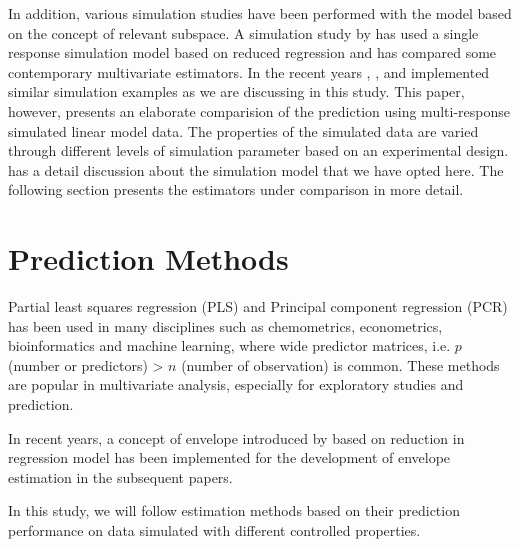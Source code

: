 \documentclass[12pt,3p,authoryear]{elsarticle}
\begin{document}
In addition, various simulation studies have been performed with the
model based on the concept of relevant subspace. A simulation study by
\citet{Alm_y_1996} has used a single response simulation model based on
reduced regression and has compared some contemporary multivariate
estimators. In the recent years \citet{helland2012near},
\citet{saebo2015simrel}, \citet{helland2016algorithms} and
\citet{Rimal2018} implemented similar simulation examples as we are
discussing in this study. This paper, however, presents an elaborate
comparision of the prediction using multi-response simulated linear
model data. The properties of the simulated data are varied through
different levels of simulation parameter based on an experimental
design. \citet{Rimal2018} has a detail discussion about the simulation
model that we have opted here. The following section presents the
estimators under comparison in more detail.

\section{Prediction Methods}\label{prediction-methods}

Partial least squares regression (PLS) and Principal component
regression (PCR) has been used in many disciplines such as chemometrics,
econometrics, bioinformatics and machine learning, where wide predictor
matrices, i.e. \(p\) (number or predictors) \textgreater{} \(n\) (number
of observation) is common. These methods are popular in multivariate
analysis, especially for exploratory studies and prediction.

In recent years, a concept of envelope introduced by \citet{Cook2007a}
based on reduction in regression model has been implemented for the
development of envelope estimation in the subsequent papers.

In this study, we will follow estimation methods based on their
prediction performance on data simulated with different controlled
properties.
\end{document}
